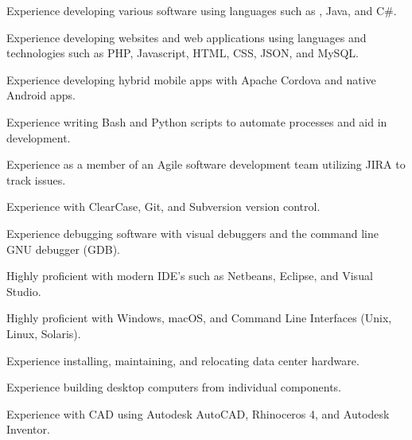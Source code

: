 \begin{itemize*}
  \item Experience developing various software using languages such as \CPP, Java, and C\#.
  \item Experience developing websites and web applications using languages and technologies such as PHP, Javascript, HTML, CSS, JSON, and MySQL.
  \item Experience developing hybrid mobile apps with Apache Cordova and native Android apps.
  \item Experience writing Bash and Python scripts to automate processes and aid in development.
  \item Experience as a member of an Agile software development team utilizing JIRA to track issues.
  \item Experience with ClearCase, Git, and Subversion version control.
  \item Experience debugging software with visual debuggers and the command line GNU debugger (GDB).
  \item Highly proficient with modern IDE’s such as Netbeans, Eclipse, and Visual Studio.
  \item Highly proficient with Windows, macOS, and Command Line Interfaces (Unix, Linux, Solaris).
  \item Experience installing, maintaining, and relocating data center hardware.
  \item Experience building desktop computers from individual components.
  \item Experience with CAD using Autodesk AutoCAD, Rhinoceros 4, and Autodesk Inventor.
\end{itemize*}


